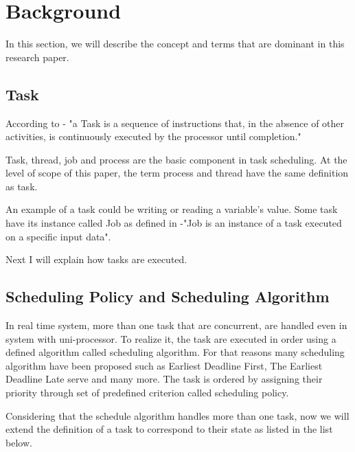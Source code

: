


\section{Background}
In this section, we will describe the concept and terms that are dominant in this research paper.

\subsection{Task}

According to \cite{b4}- "a Task is a sequence of instructions that, in the absence of other activities, is continuously executed by the processor until completion."

Task, thread, job and process  are the basic component in task scheduling. At the level of scope of this paper, the term process and thread have the same definition as task. 

An example of a task could be writing or reading a variable's value. Some task have its instance called Job as defined in \cite{b4}-"Job is an instance of a task executed on a specific input data". 

Next I will explain how tasks are executed.


\subsection{Scheduling Policy and Scheduling Algorithm }


In real time system, more than one task that are concurrent, are handled even in system with uni-processor. To realize it,  the task are executed in order using a defined algorithm called scheduling algorithm. For that reasons many scheduling algorithm have been proposed such as Earliest Deadline First, The Earliest Deadline Late serve and many more. The task is ordered by assigning their priority through set of predefined criterion called scheduling policy.

Considering that the schedule algorithm handles more than one task, now we will extend the definition of a task to correspond to their state as listed in the list below.

